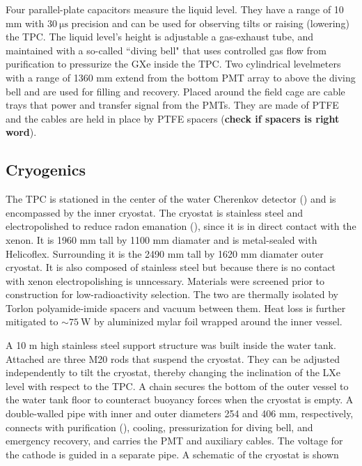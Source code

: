 Four parallel-plate capacitors measure the liquid level.  They have a range of 10 mm with $30\ \mathrm{\mu s}$ precision and can be used
for observing tilts or raising (lowering) the TPC.  The liquid level's height is adjustable a gas-exhaust tube, and maintained with a
so-called ``diving bell" that uses controlled gas flow from purification to pressurize the GXe inside the TPC.  Two cylindrical levelmeters
with a range of 1360 mm extend from the bottom PMT array to above the diving bell and are used for filling and recovery.  Placed around the
field cage are cable trays that power and transfer signal from the PMTs.  They are made of PTFE and the cables are held
in place by PTFE spacers (\textbf{check if spacers is right word}).



\subsection{Cryogenics}
\label{subsec:xenon1t_cryo}
The TPC is stationed in the center of the water Cherenkov detector () and is encompassed by the inner
cryostat.  The cryostat
is stainless steel and electropolished to reduce radon emanation (\secref{}), since it is in direct contact with the xenon.  It is 1960 mm
tall by 1100 mm diamater and is metal-sealed
with Helicoflex.  Surrounding it is the 2490 mm tall by 1620 mm diamater outer cryostat.  It is also composed of stainless steel but
because there is no contact with xenon electropolishing is unncessary.  Materials were screened prior to construction for low-radioactivity
selection.  The two are thermally isolated by Torlon polyamide-imide spacers and
vacuum between them.  Heat loss is further mitigated to ${\sim} 75\ \mathrm{W}$ by aluminized mylar foil wrapped around the inner vessel.

A 10 m high stainless steel support structure was built inside the water tank.  Attached are three M20 rods that suspend the
cryostat.  They can be adjusted independently to tilt the cryostat, thereby changing the inclination of the LXe level with respect to the
TPC.  A chain secures the bottom of the outer vessel to the water tank floor to counteract buoyancy forces when the cryostat is empty.  A
double-walled pipe with inner and outer diameters 254 and 406 mm, respectively, connects with purification (),
cooling,
pressurization for diving bell, and emergency recovery, and carries the PMT and auxiliary cables.  The voltage for the cathode is guided
in a separate pipe.  A schematic of the cryostat is shown

